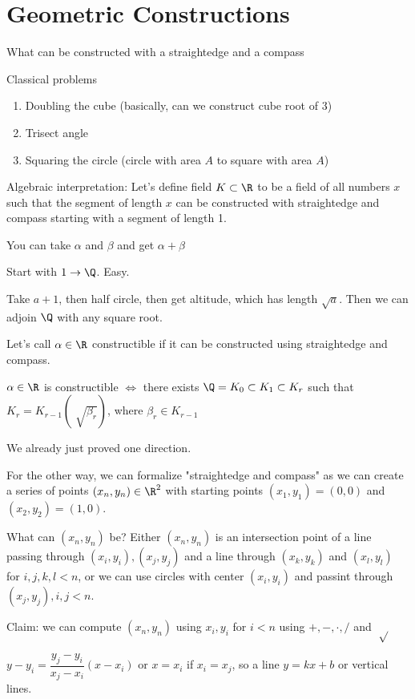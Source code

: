 \documentclass[10pt]{article}
\begin{document}
\section{Geometric Constructions}
What can be constructed with a straightedge and a compass

Classical problems
\begin{enumerate}
    \item Doubling the cube (basically, can we construct cube root of 3)
    \item Trisect angle
    \item Squaring the circle (circle with area $A$ to square with area $A$)
\end{enumerate}

Algebraic interpretation: Let's define field $K \subset \R$ to be a field of all numbers $x$ such that the segment of length $x$ can be constructed with straightedge and compass starting with a segment of length 1.

You can take $\alpha$ and $\beta$ and get $\alpha + \beta$

Start with $1 \to \Q$. Easy.

Take $a + 1$, then half circle, then get altitude, which has length $\sqrt{a}$. Then we can adjoin $\Q$ with any square root.

Let's call $\alpha \in \R$ constructible if it can be constructed using straightedge and compass. 

\begin{thm}
    $\alpha \in \R$ is constructible $\iff$ there exists $\Q = K_0 \subset K_1 \subset K_r$ such that $K_r = K_{r-1}(\sqrt[]{\beta_r})$, where $\beta_r \in K_{r-1}$
\end{thm}
We already just proved one direction.

For the other way, we can formalize "straightedge and compass" as we can create a series of points $(x_n, y_n) \in \R^2$ with starting points $(x_1, y_1) = (0, 0)$ and $(x_2, y_2) = (1, 0)$.

What can $(x_n, y_n)$ be? Either $(x_n, y_n)$ is an intersection point of a line passing through $(x_i, y_i), (x_j, y_j)$ and a line through $(x_k, y_k)$ and $(x_l, y_l)$ for $i, j, k, l < n$, or we can use circles with center $(x_i, y_i)$ and passint through $(x_j, y_j), i, j < n$.

Claim: we can compute $(x_n, y_n)$ using $x_i, y_i$ for $i < n$ using $+, -, \cdot, /$ and $\sqrt[]{}$

$y - y_i = \dfrac{y_j - y_i}{x_j - x_i}(x - x_i)$ or $x = x_i$ if $x_i = x_j$, so a line $y = kx + b$ or vertical lines.
\end{document}
